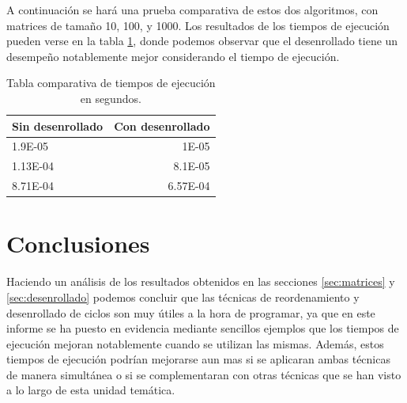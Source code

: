 A continuación se hará una prueba comparativa de estos dos algoritmos,
con matrices de tamaño 10, 100, y 1000. Los resultados de los tiempos
de ejecución pueden verse en la tabla \ref{tab:resultados}, donde
podemos observar que el desenrollado tiene un desempeño
notablemente mejor considerando el tiempo de ejecución.

\begin{table}[H]
  \centering
  \begin{tabular}{l|r}
    Sin desenrollado & Con desenrollado \\\hline
    1.9E-05 & 1E-05 \\
    1.13E-04 & 8.1E-05 \\
    8.71E-04 & 6.57E-04
  \end{tabular}
  \caption{\label{tab:resultados}Tabla comparativa de tiempos de
    ejecución en segundos.}
\end{table}

\section{Conclusiones}

Haciendo un análisis de los resultados obtenidos en las secciones
\ref{sec:matrices} y \ref{sec:desenrollado} podemos concluir que las
técnicas de reordenamiento y desenrollado de ciclos son muy útiles a
la hora de programar, ya que en este informe se ha puesto en evidencia
mediante sencillos ejemplos que los tiempos de ejecución mejoran
notablemente cuando se utilizan las mismas. Además, estos tiempos de
ejecución podrían mejorarse aun mas si se aplicaran ambas técnicas de
manera simultánea o si se complementaran con otras técnicas que se han
visto a lo largo de esta unidad temática.

 





